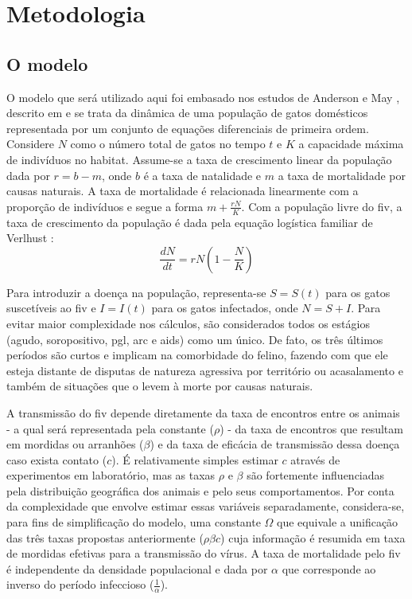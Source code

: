 \documentclass{article}
\begin{document}
\section{Metodologia}
\subsection{O modelo}
O modelo que será utilizado aqui foi embasado nos estudos de Anderson e May \cite{anderson}, descrito em \cite{base} e se trata da dinâmica de uma população de gatos domésticos representada por um conjunto de equações diferenciais de primeira ordem. Considere $N$ como  o número total de gatos no tempo $t$ e $K$ a capacidade máxima de indivíduos no habitat. Assume-se a taxa de crescimento linear da população dada por $r=b-m$, onde $b$ é a taxa de natalidade e $m$ a taxa de mortalidade por causas naturais. A taxa de mortalidade é relacionada linearmente com a proporção de indivíduos e segue a forma $
m+\frac{rN}{K}
$. Com a população livre do \gls{fiv}, a taxa de crescimento da população é dada pela equação logística familiar de Verlhust \cite{helmut}:
\begin{equation} \label{propcres}
\frac{dN}{dt} = rN\left( 1-\frac{N}{K} \right)
\end{equation}

\noindent Para introduzir a doença na população, representa-se $S = S(t)$ para os gatos suscetíveis ao \gls{fiv} e $I = I(t)$ para os gatos infectados, onde $N = S + I$. Para evitar maior complexidade nos cálculos, são considerados todos os estágios (agudo, soropositivo, \gls{pgl}, \gls{arc} e \gls{aids}) como um único. De fato, os três últimos períodos são curtos e implicam na comorbidade do felino, fazendo com que ele esteja distante de disputas de natureza agressiva por território ou acasalamento e também de situações que o levem à morte por causas naturais.

\noindent A transmissão do \gls{fiv} depende diretamente da taxa de encontros entre os animais - a qual será representada pela constante ($\rho$) - da taxa de encontros que resultam em mordidas ou arranhões ($\beta$) e da taxa de eficácia de transmissão dessa doença caso exista contato ($c$). É relativamente simples estimar $c$ através de experimentos em laboratório, mas as taxas $\rho$ e $\beta$ são fortemente influenciadas pela distribuição geográfica dos animais e pelo seus comportamentos. Por conta da complexidade que envolve estimar essas variáveis separadamente, considera-se, para fins de simplificação do modelo, uma constante $\Omega$ que equivale a unificação das três taxas propostas anteriormente ($\rho\beta c$) cuja informação é resumida em taxa de mordidas efetivas para a transmissão do vírus. A taxa de mortalidade pelo \gls{fiv} é independente da densidade populacional e dada por $\alpha$ que corresponde ao inverso do período infeccioso ($\frac{1}{\alpha}$).\\
\end{document}
